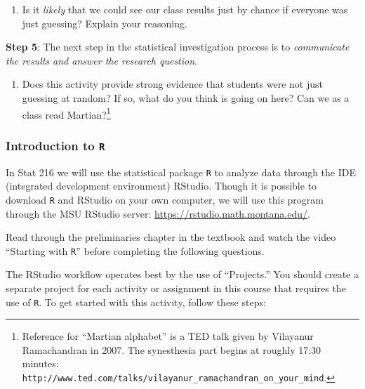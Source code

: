 \documentclass[
]{report}
\providecommand{\tightlist}{%
  \setlength{\itemsep}{0pt}\setlength{\parskip}{0pt}}
\begin{document}
\vspace{.5in}

\begin{enumerate}
\def\labelenumi{\arabic{enumi}.}
\setcounter{enumi}{16}
\tightlist
\item
  Is it \emph{likely} that we could see our class results just by chance if everyone was just guessing? Explain your reasoning.
\end{enumerate}

\vspace{.5in}

\textbf{Step 5}: The next step in the statistical investigation process is to \emph{communicate the results and answer the research question}.

\begin{enumerate}
\def\labelenumi{\arabic{enumi}.}
\setcounter{enumi}{17}
\tightlist
\item
  Does this activity provide strong evidence that students were not just guessing at random? If so, what do you think is going on here? Can we as a class read Martian?\footnote{Reference for ``Martian alphabet'' is a TED talk given by Vilayanur Ramachandran in 2007. The synesthesia part begins at roughly 17:30 minutes: \texttt{http://www.ted.com/talks/vilayanur\_ramachandran\_on\_your\_mind}.}
\end{enumerate}

\vspace{1in}

\newpage

\hypertarget{introduction-to-r}{%
\subsubsection*{\texorpdfstring{Introduction to \texttt{R}}{Introduction to R}}\label{introduction-to-r}}

In Stat 216 we will use the statistical package \texttt{R} to analyze data through the IDE (integrated development environment) RStudio. Though it is possible to download \texttt{R} and RStudio on your own computer, we will use this program through the MSU RStudio server: \url{https://rstudio.math.montana.edu/}.

Read through the preliminaries chapter in the textbook and watch the video ``Starting with \texttt{R}'' before completing the following questions.

The RStudio workflow operates best by the use of ``Projects.'' You should create a separate project for each activity or assignment in this course that requires the use of \texttt{R}. To get started with this activity, follow these steps:
\end{document}
